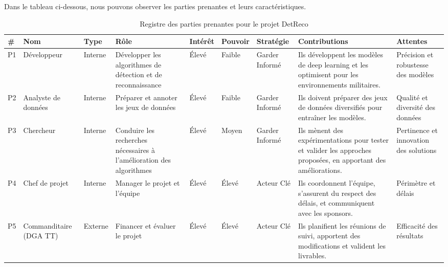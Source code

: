 Dans le tableau ci-dessous, nous pouvons observer les parties prenantes et leurs caractéristiques.

\begin{table}[h]
    \centering
    \scriptsize
    \begin{tabular}{|p{0.3cm}|p{1.9cm}|p{0.9cm}|p{2.5cm}|p{0.9cm}|p{1cm}|p{1.5cm}|p{2.7cm}|p{2.3cm}|}
        \hline
        \rowcolor{green} \textbf{\#} & \textbf{Nom}           & \textbf{Type} & \textbf{Rôle}                                                        & \textbf{Intérêt} & \textbf{Pouvoir} & \textbf{Stratégie} & \textbf{Contributions}                                                                                          & \textbf{Attentes}                      \\
        \hline
        P1                           & Développeur            & Interne       & Développer les algorithmes de détection et de reconnaissance         & Élevé            & Faible           & Garder Informé     & Ils développent les modèles de deep learning et les optimisent pour les environnements militaires.              & Précision et robustesse des modèles    \\
        \hline
        P2                           & Analyste de données    & Interne       & Préparer et annoter les jeux de données                              & Élevé            & Faible           & Garder Informé     & Ils doivent préparer des jeux de données diversifiés pour entraîner les modèles.                                & Qualité et diversité des données       \\
        \hline
        P3                           & Chercheur              & Interne       & Conduire les recherches nécessaires à l'amélioration des algorithmes & Élevé            & Moyen            & Garder Informé     & Ils mènent des expérimentations pour tester et valider les approches proposées, en apportant des améliorations. & Pertinence et innovation des solutions \\
        \hline
        P4                           & Chef de projet         & Interne       & Manager le projet et l'équipe                                        & Élevé            & Élevé            & Acteur Clé         & Ils coordonnent l'équipe, s'assurent du respect des délais, et communiquent avec les sponsors.                  & Périmètre et délais                    \\
        \hline
        P5                           & Commanditaire (DGA TT) & Externe       & Financer et évaluer le projet                                        & Élevé            & Élevé            & Acteur Clé         & Ils planifient les réunions de suivi, apportent des modifications et valident les livrables.                    & Efficacité des résultats               \\
        \hline
    \end{tabular}
    \caption{Registre des parties prenantes pour le projet DetReco}
\end{table}


